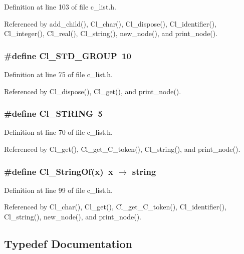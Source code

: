 Definition at line 103 of file c\_\-list.h.

Referenced by add\_\-child(), Cl\_\-char(), Cl\_\-dispose(), Cl\_\-identifier(), Cl\_\-integer(), Cl\_\-real(), Cl\_\-string(), new\_\-node(), and print\_\-node().
\subsubsection{\setlength{\rightskip}{0pt plus 5cm}\#define Cl\_\-STD\_\-GROUP~10}\label{c__list_8h_12d3634aeab95d95d28b82f9be99be78}




Definition at line 75 of file c\_\-list.h.

Referenced by Cl\_\-dispose(), Cl\_\-get(), and print\_\-node().
\subsubsection{\setlength{\rightskip}{0pt plus 5cm}\#define Cl\_\-STRING~5}\label{c__list_8h_840bb8b4c2c47366197337f091248040}




Definition at line 70 of file c\_\-list.h.

Referenced by Cl\_\-get(), Cl\_\-get\_\-C\_\-token(), Cl\_\-string(), and print\_\-node().
\subsubsection{\setlength{\rightskip}{0pt plus 5cm}\#define Cl\_\-String\-Of(x)~x $\rightarrow$ string}\label{c__list_8h_7820e08881fcc3e5fcff336383566df5}




Definition at line 99 of file c\_\-list.h.

Referenced by Cl\_\-char(), Cl\_\-get(), Cl\_\-get\_\-C\_\-token(), Cl\_\-identifier(), Cl\_\-string(), new\_\-node(), and print\_\-node().

\subsection{Typedef Documentation}
